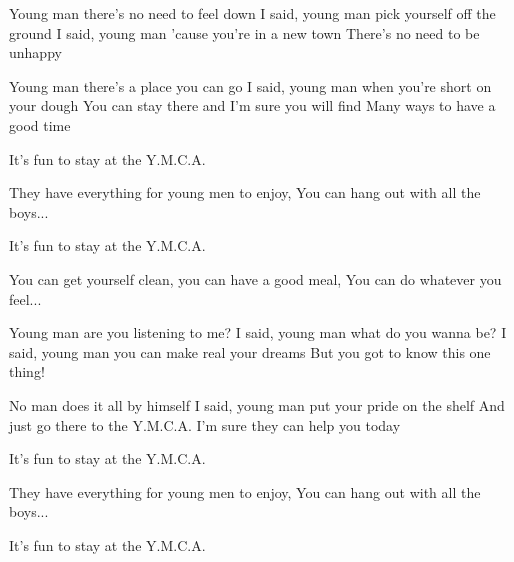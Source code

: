\begin{verse*}
Young man
there's no need to feel down
I said, young man
pick yourself off the ground
I said, young man
'cause you're in a new town
There's no need to be unhappy
\end{verse*}

\begin{verse*}
Young man
there's a place you can go
I said, young man
when you're short on your dough
You can stay there
and I'm sure you will find
Many ways to have a good time
\end{verse*}

\begin{verse*}
It's fun to stay at the Y.M.C.A. 
\end{verse*}

\begin{verse*}
They have everything for young men to enjoy,
You can hang out with all the boys...
\end{verse*}

\begin{verse*}
It's fun to stay at the Y.M.C.A. 
\end{verse*}

\begin{verse*}
You can get yourself clean, you can have a good meal,
You can do whatever you feel...
\end{verse*}

\begin{verse*}
Young man
are you listening to me?
I said, young man
what do you wanna be?
I said, young man
you can make real your dreams
But you got to know this one thing!
\end{verse*}

\begin{verse*}
No man
does it all by himself
I said, young man
put your pride on the shelf
And just go there
to the Y.M.C.A.
I'm sure they can help you today
\end{verse*}

\begin{verse*}
It's fun to stay at the Y.M.C.A. 
\end{verse*}

\begin{verse*}
They have everything for young men to enjoy,
You can hang out with all the boys...
\end{verse*}

\begin{verse*}
It's fun to stay at the Y.M.C.A. 
\end{verse*}

